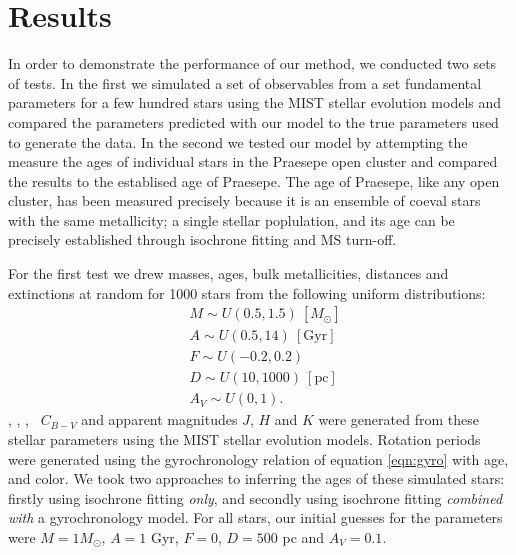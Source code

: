 \section{Results}
\label{section:results}

In order to demonstrate the performance of our method, we conducted two sets
of tests.
In the first we simulated a set of observables from a set fundamental
parameters for a few hundred stars using the MIST stellar evolution models and
compared the parameters predicted with our model to the true parameters used
to generate the data.
In the second we tested our model by attempting the measure the ages of
individual stars in the Praesepe open cluster and compared the results to the
establised age of Praesepe.
The age of Praesepe, like any open cluster, has been measured precisely
because it is an ensemble of coeval stars with the same metallicity; a single
stellar poplulation, and its age can be precisely established through
isochrone fitting and MS turn-off.

For the first test we drew masses, ages, bulk metallicities, distances and
extinctions at random for 1000 stars from the following uniform distributions:
\begin{eqnarray}
& M \sim U(0.5, 1.5)~[M_\odot] \\
& A \sim U(0.5, 14)\mathrm{~[Gyr]} \\
& F \sim U(-0.2, 0.2) \\
& D \sim U(10, 1000)~\mathrm{[pc]} \\
& A_V \sim U(0, 1).
\end{eqnarray}
\teff, \logg, \fhat, \pmega\, $C_{B-V}$ and apparent magnitudes $J$, $H$ and
$K$ were generated from these stellar parameters using the MIST stellar
evolution models.
Rotation periods were generated using the gyrochronology relation of
equation \ref{eqn:gyro} with age, and color.
We took two approaches to inferring the ages of these simulated stars:
firstly using isochrone fitting {\it only}, and secondly using isochrone
fitting {\it combined with} a gyrochronology model.
For all stars, our initial guesses for the parameters were $M = 1M_\odot$,
$A = 1$ Gyr, $F = 0$, $D = 500$ pc and $A_V = 0.1$.


